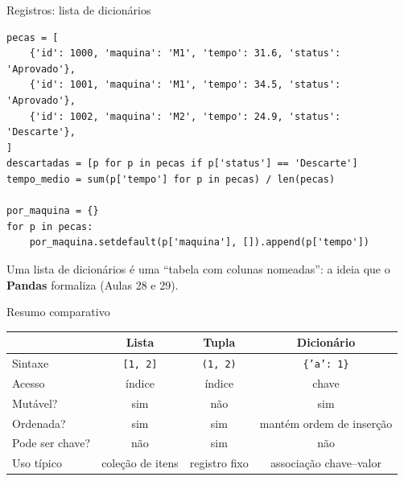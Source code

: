 \documentclass[aspectratio=169,10pt,t]{beamer}
\begin{document}
\begin{frame}[fragile]{Registros: lista de dicionários}
\begin{lstlisting}
pecas = [
    {'id': 1000, 'maquina': 'M1', 'tempo': 31.6, 'status': 'Aprovado'},
    {'id': 1001, 'maquina': 'M1', 'tempo': 34.5, 'status': 'Aprovado'},
    {'id': 1002, 'maquina': 'M2', 'tempo': 24.9, 'status': 'Descarte'},
]
descartadas = [p for p in pecas if p['status'] == 'Descarte']
tempo_medio = sum(p['tempo'] for p in pecas) / len(pecas)

por_maquina = {}
for p in pecas:
    por_maquina.setdefault(p['maquina'], []).append(p['tempo'])
\end{lstlisting}
  \small Uma lista de dicionários é uma ``tabela com colunas nomeadas'': a ideia que o \textbf{Pandas} formaliza (Aulas 28 e 29).
\end{frame}

\begin{frame}{Resumo comparativo}
  \centering\small
  \begin{tabular}{lccc}
    \toprule
    & \textbf{Lista} & \textbf{Tupla} & \textbf{Dicionário}\\
    \midrule
    Sintaxe & \texttt{[1, 2]} & \texttt{(1, 2)} & \texttt{\{'a': 1\}}\\
    Acesso & índice & índice & chave\\
    Mutável? & sim & \alert{não} & sim\\
    Ordenada? & sim & sim & mantém ordem de inserção\\
    Pode ser chave? & não & sim & não\\
    Uso típico & coleção de itens & registro fixo & associação chave--valor\\
    \bottomrule
  \end{tabular}
\end{frame}


\end{document}
